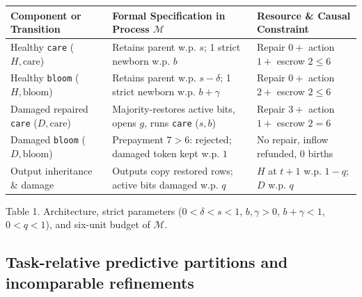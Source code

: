 \documentclass[12pt,letterpaper]{article}
\newcounter{none}
\begin{document}
{\def\LTcaptype{none} %
\begin{longtable}[]{@{}
  >{\raggedright\arraybackslash}p{}
  >{\raggedright\arraybackslash}p{}
  >{\raggedright\arraybackslash}p{}@{}}
\toprule\noalign{}
\begin{minipage}[b]{\linewidth}\raggedright
Component or Transition
\end{minipage} & \begin{minipage}[b]{\linewidth}\raggedright
Formal Specification in Process \(\mathcal{M}\)
\end{minipage} & \begin{minipage}[b]{\linewidth}\raggedright
Resource \& Causal Constraint
\end{minipage} \\
\midrule\noalign{}
\endhead
\bottomrule\noalign{}
\endlastfoot
Healthy \texttt{care} (\(H, \mathrm{care}\)) & Retains parent w.p.
\(s\); 1 strict newborn w.p. \(b\) & Repair \(0 +\) action \(1 +\)
escrow \(2 \le 6\) \\
Healthy \texttt{bloom} (\(H, \mathrm{bloom}\)) & Retains parent w.p.
\(s - \delta\); 1 strict newborn w.p. \(b + \gamma\) & Repair \(0 +\)
action \(2 +\) escrow \(2 \le 6\) \\
Damaged repaired \texttt{care} (\(D, \mathrm{care}\)) &
Majority-restores active bits, opens \(g\), runs \texttt{care}
(\(s, b\)) & Repair \(3 +\) action \(1 +\) escrow \(2 = 6\) \\
Damaged \texttt{bloom} (\(D, \mathrm{bloom}\)) & Prepayment \(7 > 6\):
rejected; damaged token kept w.p. \(1\) & No repair, inflow refunded,
\(0\) births \\
Output inheritance \& damage & Outputs copy restored rows; active bits
damaged w.p. \(q\) & \(H\) at \(t+1\) w.p. \(1-q\); \(D\) w.p. \(q\) \\
\end{longtable}
}

Table 1. Architecture, strict parameters (\(0 < \delta < s < 1\),
\(b,\gamma > 0\), \(b+\gamma < 1\), \(0 < q < 1\)), and six-unit budget
of \(\mathcal{M}\).

\subsection{Task-relative predictive partitions and incomparable
refinements}\label{task-relative-predictive-partitions-and-incomparable-refinements}
\end{document}

